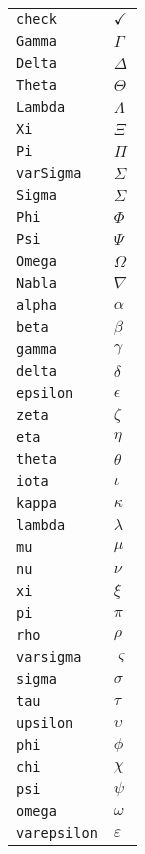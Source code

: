 \begin{longtable}{ll}
\texttt{check}&${}\checkmark {}$\\
\texttt{Gamma}&${}\Gamma {}$\\
\texttt{Delta}&${}\Delta {}$\\
\texttt{Theta}&${}\Theta {}$\\
\texttt{Lambda}&${}\Lambda {}$\\
\texttt{Xi}&${}\Xi {}$\\
\texttt{Pi}&${}\Pi {}$\\
\texttt{varSigma}&${}\varSigma {}$\\
\texttt{Sigma}&${}\Sigma {}$\\
\texttt{Phi}&${}\Phi {}$\\
\texttt{Psi}&${}\Psi {}$\\
\texttt{Omega}&${}\Omega {}$\\
\texttt{Nabla}&${}\nabla {}$\\
\texttt{alpha}&${}\alpha {}$\\
\texttt{beta}&${}\beta {}$\\
\texttt{gamma}&${}\gamma {}$\\
\texttt{delta}&${}\delta {}$\\
\texttt{epsilon}&${}\epsilon {}$\\
\texttt{zeta}&${}\zeta {}$\\
\texttt{eta}&${}\eta {}$\\
\texttt{theta}&${}\theta {}$\\
\texttt{iota}&${}\iota {}$\\
\texttt{kappa}&${}\kappa {}$\\
\texttt{lambda}&${}\lambda {}$\\
\texttt{mu}&${}\mu {}$\\
\texttt{nu}&${}\nu {}$\\
\texttt{xi}&${}\xi {}$\\
\texttt{pi}&${}\pi {}$\\
\texttt{rho}&${}\rho {}$\\
\texttt{varsigma}&${}\varsigma {}$\\
\texttt{sigma}&${}\sigma {}$\\
\texttt{tau}&${}\tau {}$\\
\texttt{upsilon}&${}\upsilon {}$\\
\texttt{phi}&${}\phi {}$\\
\texttt{chi}&${}\chi {}$\\
\texttt{psi}&${}\psi {}$\\
\texttt{omega}&${}\omega {}$\\
\texttt{varepsilon}&${}\varepsilon {}$\\

\end{longtable}
